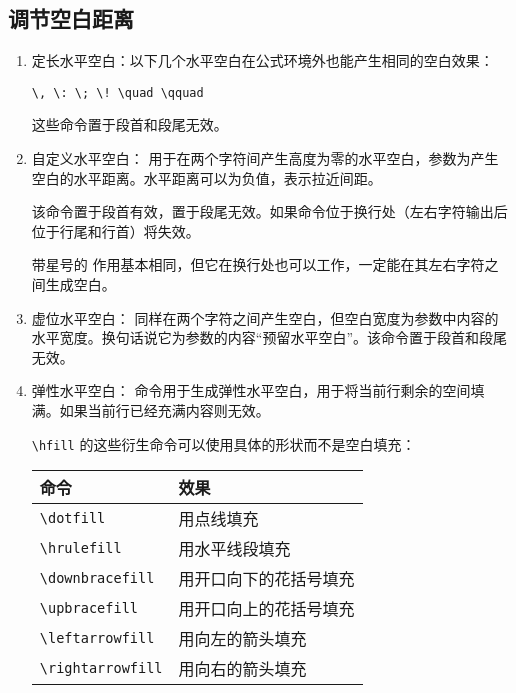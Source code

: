 \subsection{调节空白距离}

\begin{enumerate}

\item 定长水平空白：以下几个水平空白在公式环境外也能产生相同的空白效果：

\begin{tcolorbox}[colback=white]
\begin{lstlisting}
\, \: \; \! \quad \qquad
\end{lstlisting}
\end{tcolorbox}

这些命令置于段首和段尾无效。

\item 自定义水平空白：\boxforcmd{\\hspace{}} 用于在两个字符间产生高度为零的水平空白，参数为产生空白的水平距离。水平距离可以为负值，表示拉近间距。

该命令置于段首有效，置于段尾无效。如果命令位于换行处（左右字符输出后位于行尾和行首）将失效。

带星号的 \boxforcmd{\\hspace*{}} 作用基本相同，但它在换行处也可以工作，一定能在其左右字符之间生成空白。

\item 虚位水平空白：\boxforcmd{\\hphantom{}} 同样在两个字符之间产生空白，但空白宽度为参数中内容的水平宽度。换句话说它为参数的内容“预留水平空白”。该命令置于段首和段尾无效。

\item 弹性水平空白：\boxforcmd{\\hfill} 命令用于生成弹性水平空白，用于将当前行剩余的空间填满。如果当前行已经充满内容则无效。

\verb|\hfill| 的这些衍生命令可以使用具体的形状而不是空白填充：

\begin{tcolorbox}[colback=white]
\begin{center}
\begin{tabular}{ll}
    \mbox{} \hfill 命令 \hfill \mbox{} & \mbox{} \hfill 效果 \hfill \mbox{} \\
\hline
    \verb|\dotfill| &  用点线填充 \\
    \verb|\hrulefill| &  用水平线段填充 \\
    \verb|\downbracefill| &  用开口向下的花括号填充 \\
    \verb|\upbracefill| &  用开口向上的花括号填充 \\
    \verb|\leftarrowfill| &  用向左的箭头填充 \\
    \verb|\rightarrowfill| &  用向右的箭头填充 \\
\end{tabular}
\end{center}
\end{tcolorbox}


\end{enumerate}
